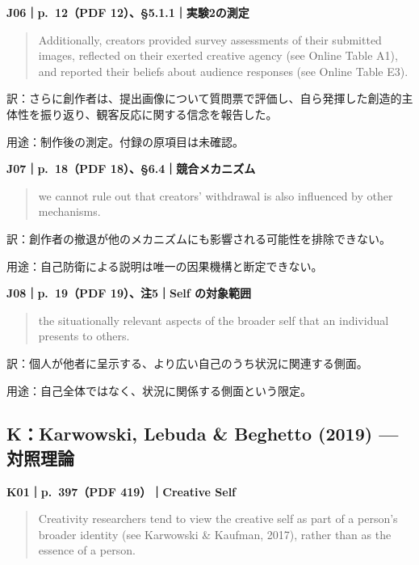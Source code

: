 \documentclass[
  11pt,
  a4paper,
]{article}
\begin{document}

\textbf{J06｜p.~12（PDF 12）、§5.1.1｜実験2の測定}

\begin{quote}
Additionally, creators provided survey assessments of their submitted
images, reflected on their exerted creative agency (see Online Table
A1), and reported their beliefs about audience responses (see Online
Table E3).
\end{quote}

訳：さらに創作者は、提出画像について質問票で評価し、自ら発揮した創造的主体性を振り返り、観客反応に関する信念を報告した。

用途：制作後の測定。付録の原項目は未確認。


\textbf{J07｜p.~18（PDF 18）、§6.4｜競合メカニズム}

\begin{quote}
we cannot rule out that creators' withdrawal is also influenced by other
mechanisms.
\end{quote}

訳：創作者の撤退が他のメカニズムにも影響される可能性を排除できない。

用途：自己防衛による説明は唯一の因果機構と断定できない。


\textbf{J08｜p.~19（PDF 19）、注5｜Self の対象範囲}

\begin{quote}
the situationally relevant aspects of the broader self that an
individual presents to others.
\end{quote}

訳：個人が他者に呈示する、より広い自己のうち状況に関連する側面。

用途：自己全体ではなく、状況に関係する側面という限定。

\subsection{K：Karwowski, Lebuda \& Beghetto (2019) ---
対照理論}\label{kkarwowski-lebuda-beghetto-2019-ux5bfeux7167ux7406ux8ad6}


\textbf{K01｜p.~397（PDF 419）｜Creative Self}

\begin{quote}
Creativity researchers tend to view the creative self as part of a
person's broader identity (see Karwowski \& Kaufman, 2017), rather than
as the essence of a person.
\end{quote}
\end{document}
